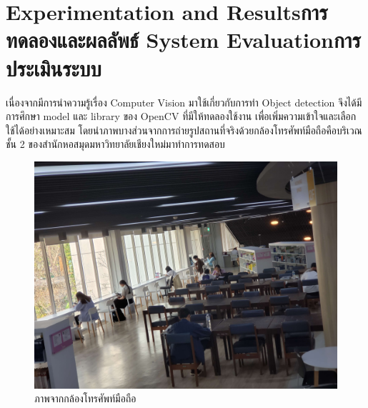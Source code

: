 \chapter{\ifproject%
\ifenglish Experimentation and Results\else การทดลองและผลลัพธ์\fi
\else%
\ifenglish System Evaluation\else การประเมินระบบ\fi
\fi}

\hspace{10mm} เนื่องจากมีการนำความรู้เรื่อง Computer Vision มาใช้เกี่ยวกับการทำ Object detection จึงได้มีการศึกษา model และ library
ของ OpenCV ที่มีให้ทดลองใช้งาน เพื่อเพิ่มความเข้าใจและเลือกใช้ได้อย่างเหมาะสม โดยนำภาพบางส่วนจากการถ่ายรูปสถานที่จริงด้วยกล้องโทรศัพท์มือถือคือบริเวณชั้น 2
ของสำนักหอสมุดมหาวิทยาลัยเชียงใหม่มาทำการทดสอบ

\begin{figure}[h]
    \centering
    \includegraphics[scale=0.07]{images/cam2-2.jpg}
    \caption[camera]{ภาพจากกล้องโทรศัพท์มือถือ}
    \label{fig:camera}
\end{figure}

